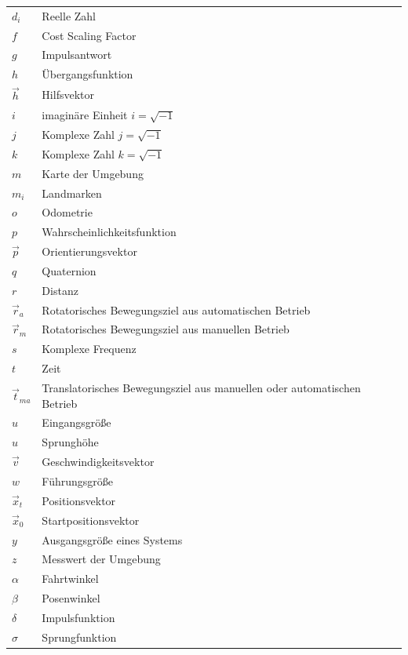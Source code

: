 \documentclass[12pt,a4paper,oneside,numbers=noenddot,headsepline,captions=tableheading,toc=bibliography,openany,tikz,margin=5mm]{scrbook}
\begin{document}
\begin{longtable}{p{3cm}p{8cm}}
		$d_{i}$&Reelle Zahl\\
		$f$&Cost Scaling Factor\\
		$g$& Impulsantwort\\
		$h$&Übergangsfunktion	\\
		$\vec{h}$& Hilfsvektor \\
		$i$&imaginäre Einheit $i=\sqrt{-1}$\\
		$j$&Komplexe Zahl $j=\sqrt{-1}$\\
		$k$&Komplexe Zahl $k=\sqrt{-1}$\\
		$m$&Karte der Umgebung\\
		$m_{i}$&Landmarken\\
		$o$&Odometrie\\
		$p$&Wahrscheinlichkeitsfunktion\\
		$\vec{p}$&Orientierungsvektor\\
		$q$&Quaternion\\
		$r$&Distanz\\
		$\vec{r}_a$	&Rotatorisches Bewegungsziel aus automatischen Betrieb \\
		$\vec{r}_m$	&Rotatorisches Bewegungsziel aus manuellen Betrieb \\
		$s$&Komplexe Frequenz\\
		$t$	&Zeit \\
		$\vec{t}_{ma}$	&Translatorisches Bewegungsziel aus manuellen oder automatischen Betrieb \\
		$u$& Eingangsgröße		\\
		$\hat{u}$&Sprunghöhe	\\
		$\vec{v}$&Geschwindigkeitsvektor\\
		$w$&Führungsgröße		\\
		$\vec{x}_{t}$&Positionsvektor\\
		$\vec{x}_{0}$&Startpositionsvektor\\
		$y$& Ausgangsgröße eines Systems 				\\
		$z$&Messwert der Umgebung\\
		$\alpha$&Fahrtwinkel	\\
		$\beta$&Posenwinkel		\\ 
		$\delta$&Impulsfunktion\\
		$\sigma$&Sprungfunktion	\\ \hline
		\bottomrule
	\end{longtable}
	
	
	
	\cleardoublepage
	\pagestyle{headings}
	\setlength{\parskip}{0.1em}
	
	
	
	
	
	\clearpage
	
\end{document}
